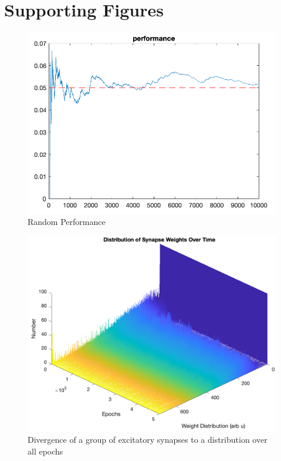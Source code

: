 \documentclass[11pt, twocolumn]{article}
\begin{document}
\section*{Supporting Figures}
\begin{figure}[H]
	\centering
	\includegraphics[width=\linewidth]{random_performance}
	\caption{Random Performance}
	\label{fig:random_movement}
\end{figure}

\begin{figure}[H]
	\centering
	\includegraphics[width=\linewidth]{weights_drift_3D}
	\caption{Divergence of a group of excitatory synapses to a distribution over all epochs}
	\label{fig:weights_drift_3D}
\end{figure}
\end{document}
